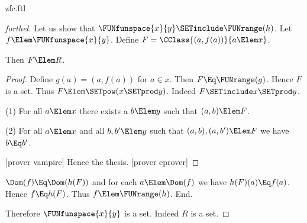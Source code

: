\documentclass{stex}
\begin{document}
\begin{smodule}{zfc.ftl}
\begin{proof}[forthel]
  Let us show that $\FUNfunspace{x}{y} \SETinclude \FUNrange(h)$.
    Let $f \Elem \FUNfunspace{x}{y}$.
    Define $F = \CClass{(a,f(a))}{a \Elem x}$.

    Then $F \Elem R$.
    \begin{proof}
      Define $g(a) = (a,f(a))$ for $a \in x$.
      Then $F \Eq \FUNrange(g)$.
      Hence $F$ is a set.
      Thus $F \Elem \SETpow(x \SETprod y)$.
      Indeed $F \SETinclude x \SETprod y$.

      (1) For all $a \Elem x$ there exists a $b \Elem y$ such that $(a,b) \Elem F$.

      (2) For all $a \Elem x$ and all $b, b' \Elem y$ such that $(a,b),
      (a,b') \Elem F$ we have $b \Eq b'$.

      [prover vampire]
      Hence the thesis.
      [prover eprover]
    \end{proof}

    $\Dom(f) \Eq \Dom(h(F))$ and for each $a \Elem \Dom(f)$ we have $h(F)(a) \Eq f(a)$.
    Hence $f \Eq h(F)$.
    Thus $f \Elem \FUNrange(h)$.
  End.

  Therefore $\FUNfunspace{x}{y}$ is a set.
  Indeed $R$ is a set.
\end{proof}
\end{smodule}
\end{document}
